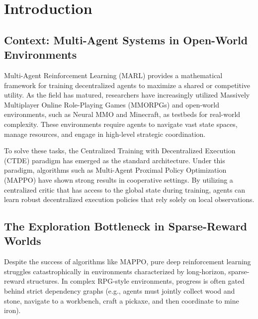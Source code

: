 \section{Introduction}
\label{ch:introduction}

\subsection{Context: Multi-Agent Systems in Open-World Environments}
\label{sec:context}

Multi-Agent Reinforcement Learning (MARL) provides a mathematical framework for training decentralized agents to maximize a shared or competitive utility. As the field has matured, researchers have increasingly utilized Massively Multiplayer Online Role-Playing Games (MMORPGs) and open-world environments, such as Neural MMO and Minecraft, as testbeds for real-world complexity. These environments require agents to navigate vast state spaces, manage resources, and engage in high-level strategic coordination.

To solve these tasks, the Centralized Training with Decentralized Execution (CTDE) paradigm has emerged as the standard architecture. Under this paradigm, algorithms such as Multi-Agent Proximal Policy Optimization (MAPPO) \parencite{Yu_Velu_Vinitsky_Gao_Wang_Bayen_Wu_2022} have shown strong results in cooperative settings. By utilizing a centralized critic that has access to the global state during training, agents can learn robust decentralized execution policies that rely solely on local observations.

\subsection{The Exploration Bottleneck in Sparse-Reward Worlds}
\label{sec:problem_statement}

Despite the success of algorithms like MAPPO, pure deep reinforcement learning struggles catastrophically in environments characterized by long-horizon, sparse-reward structures. In complex RPG-style environments, progress is often gated behind strict dependency graphs (e.g., agents must jointly collect wood and stone, navigate to a workbench, craft a pickaxe, and then coordinate to mine iron). 


